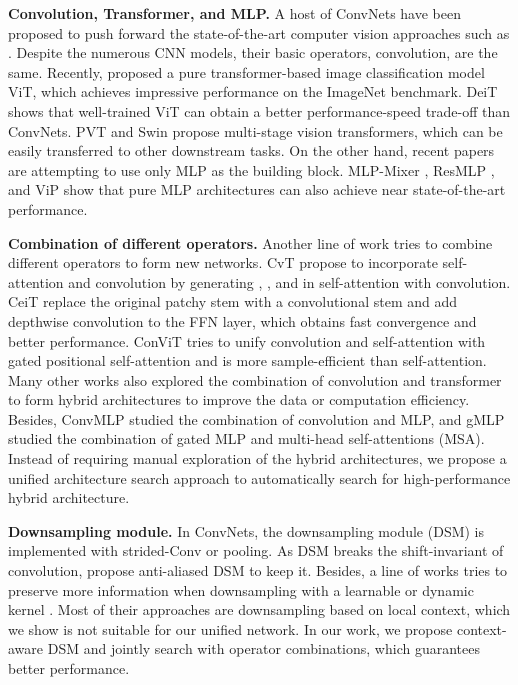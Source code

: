 \documentclass[runningheads]{llncs}
\begin{document}
\noindent\textbf{Convolution, Transformer, and MLP.}
A host of ConvNets have been proposed to push forward the state-of-the-art computer vision approaches such as \cite{resnet,inception,efficientnet}. Despite the numerous CNN models, their basic operators, convolution, are the same. Recently, \cite{vit} proposed a pure transformer-based image classification model ViT, which achieves impressive performance on the ImageNet benchmark. DeiT \cite{deit} shows that well-trained ViT can obtain a better performance-speed trade-off than ConvNets. PVT \cite{pvt} and Swin \cite{swin} propose multi-stage vision transformers, which can be easily transferred to other downstream tasks. On the other hand, recent papers are attempting to use only MLP as the building block. MLP-Mixer \cite{mixer}, ResMLP \cite{resmlp}, and ViP \cite{vip} show that pure MLP architectures can also achieve near state-of-the-art performance. 


\noindent\textbf{Combination of different operators.}
Another line of work tries to combine different operators to form new networks. CvT \cite{cvt} propose to incorporate self-attention and convolution by generating , , and  in self-attention with convolution. CeiT \cite{yuan2021incorporating} replace the original patchy stem with a convolutional stem and add depthwise convolution to the FFN layer, which obtains fast convergence and better performance. ConViT \cite{convit} tries to unify convolution and self-attention with gated positional self-attention and is more sample-efficient than self-attention. Many other works \cite{coatnet,cmt,nasvit,container} also explored the combination of convolution and transformer to form hybrid architectures to improve the data or computation efficiency. Besides, ConvMLP \cite{convmlp} studied the combination of convolution and MLP, and gMLP \cite{gmlp} studied the combination of gated MLP and multi-head self-attentions (MSA). Instead of requiring manual exploration of the hybrid architectures, we propose a unified architecture search approach to automatically search for high-performance hybrid architecture.


\noindent\textbf{Downsampling module.}
In ConvNets, the downsampling module (DSM) is implemented with strided-Conv or pooling.  As DSM breaks the shift-invariant of convolution, \cite{zhang2019shiftinvar} propose anti-aliased DSM to keep it. Besides, a line of works tries to preserve more information when downsampling with a learnable or dynamic kernel \cite{lip,dpp,carafe++}. Most of their approaches are downsampling based on local context, which we show is not suitable for our unified network. In our work, we propose context-aware DSM and jointly search with operator combinations, which guarantees better performance.
\end{document}
